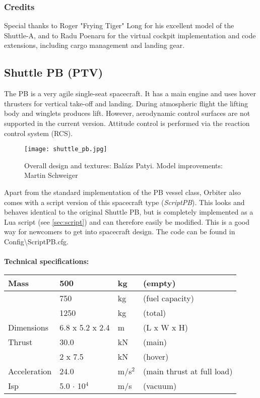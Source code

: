 \documentclass[Orbiter User Manual.tex]{subfiles}
\begin{document}
\subsubsection{Credits}
Special thanks to Roger "Frying Tiger" Long for his excellent model of the Shuttle-A, and to Radu Poenaru for the virtual cockpit implementation and code extensions, including cargo management and landing gear.


\subsection{Shuttle PB (PTV)}
The PB is a very agile single-seat spacecraft. It has a main engine and uses hover thrusters for vertical take-off and landing. During atmospheric flight the lifting body and winglets produces lift. However, aerodynamic control surfaces are not supported in the current version. Attitude control is performed via the reaction control system (RCS).\\

\begin{figure}[H]
  \centering
  \texttt{[image: shuttle\_pb.jpg]}
  \caption{Overall design and textures: Balázs Patyi. Model improvements: Martin Schweiger}
\end{figure}

\noindent
Apart from the standard implementation of the PB vessel class, Orbiter also comes with a script version of this spacecraft type (\textit{ScriptPB}). This looks and behaves identical to the original Shuttle PB, but is completely implemented as a Lua script (see \ref{sec:script}) and can therefore easily be modified. This is a good way for newcomers to get into spacecraft design. The code can be found in Config\textbackslash ScriptPB.cfg.\\
\\
\textbf{Technical specifications:}

	\begin{longtable}{ |p{}|p{}|p{}|p{}| }
	\hline\rule{0pt}{2ex}
	Mass & 500 & kg & (empty)\\
	\hline\rule{0pt}{2ex}
	& 750 & kg & (fuel capacity)\\
	\hline\rule{0pt}{2ex}
	& 1250 & kg & (total)\\
	\hline\rule{0pt}{2ex}
	Dimensions & 6.8 x 5.2 x 2.4 & m & (L x W x H)\\
	\hline\rule{0pt}{2ex}
	Thrust & 30.0 & kN & (main)\\
	\hline\rule{0pt}{2ex}
	& 2 x 7.5 & kN & (hover)\\
	\hline\rule{0pt}{2ex}
	Acceleration & 24.0 & m/s$^{2}$ & (main thrust at full load)\\
	\hline\rule{0pt}{2ex}
	Isp & 5.0 $\cdot$ 10$^{4}$ & m/s & (vacuum)\\
	\hline
	\end{longtable}
\end{document}
